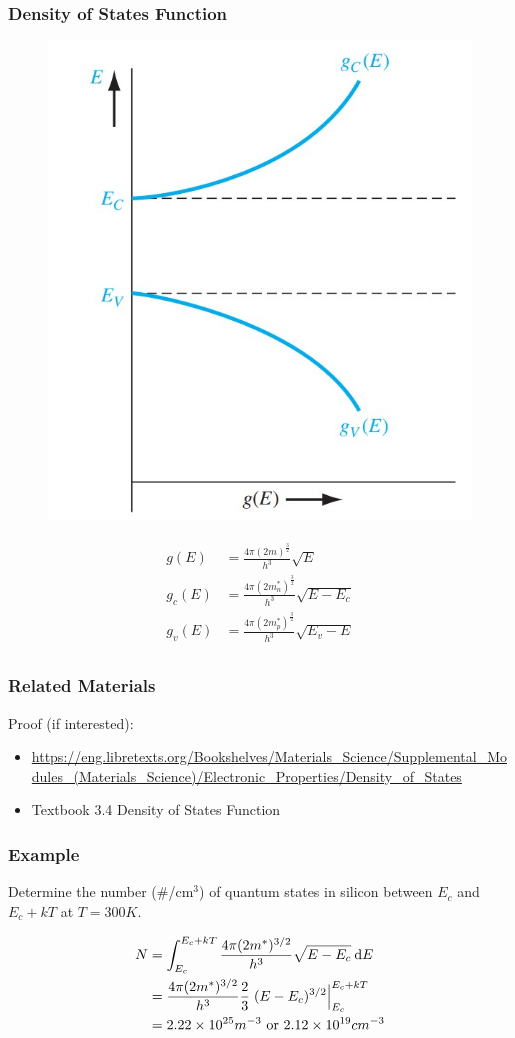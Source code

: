 \documentclass{beamer}
\begin{document}
    \begin{frame} \frametitle{Density of States Function}
        \begin{figure}[H]
            \centering
            \includegraphics[width=0.3\linewidth]{Density-state-function.jpg}
            \label{fig:Density-state-function.jpg}
        \end{figure}
        \begin{equation*}
            \boxed{
                \begin{aligned}
                    g(E) &= \frac{4 \pi (2m)^{\frac{3}{2} }}{h^3} \sqrt{E}  \\
                    g_c(E) &= \frac{4 \pi (2m_n^*)^{\frac{3}{2} }}{h^3} \sqrt{E - E_c}  \\
                    g_v(E) &= \frac{4 \pi (2m_p^*)^{\frac{3}{2} }}{h^3} \sqrt{E_v - E}  \\
                \end{aligned}
            }
        \end{equation*}
    \end{frame}

    \begin{frame} \frametitle{Related Materials}
        Proof (if interested):
        \begin{itemize}
            \item \url{https://eng.libretexts.org/Bookshelves/Materials\_Science/Supplemental\_Modules\_(Materials\_Science)/Electronic\_Properties/Density\_of\_States}
            \item Textbook 3.4 Density of States Function
        \end{itemize}
    \end{frame}

    \begin{frame} \frametitle{Example}
        \par Determine the number (\#/cm$^3$) of quantum states in silicon between $E_c$ and $E_c + kT$ at $T = 300K$.

        \begin{equation*}
            \begin{aligned}
                N &= \int_{E_c}^{E_c + kT} \frac{4\pi (2m^*)^{3/2}}{h^3} \sqrt{E - E_c} \: \mathrm{d} E  \\
                &= \frac{4\pi (2m^*)^{3/2}}{h^3} \frac{2}{3} \left. (E - E_c)^{3/2} \right|_{E_c}^{E_c + kT} \\
                &= 2.22 \times 10^{25} m^{-3}\text{ or } 2.12 \times 10^{19} cm^{-3}
            \end{aligned}
        \end{equation*}

    \end{frame}
\end{document}
